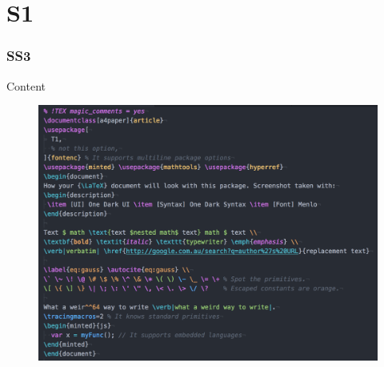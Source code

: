 \documentclass{article}
\begin{document}
\section{S1}
\subsubsection{{SS3}}




% 


% 
Content
%
%
\begin{figure}[h t p b]
  \centering
  \includegraphics[width=\textwidth]{fig1.png}
  \caption{}
  \label{}
\end{figure}
\end{document}
